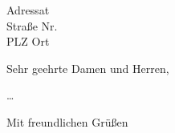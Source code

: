 \documentclass[
	fsphys,
	a4paper,
	12pt,
	german, ngerman
]{scrlttr2}
\begin{document}
\begin{letter}{Adressat\\Straße Nr.\\PLZ Ort}

\opening{Sehr geehrte Damen und Herren,}

…

\closing{Mit freundlichen Grüßen}




\end{letter}
\end{document}
